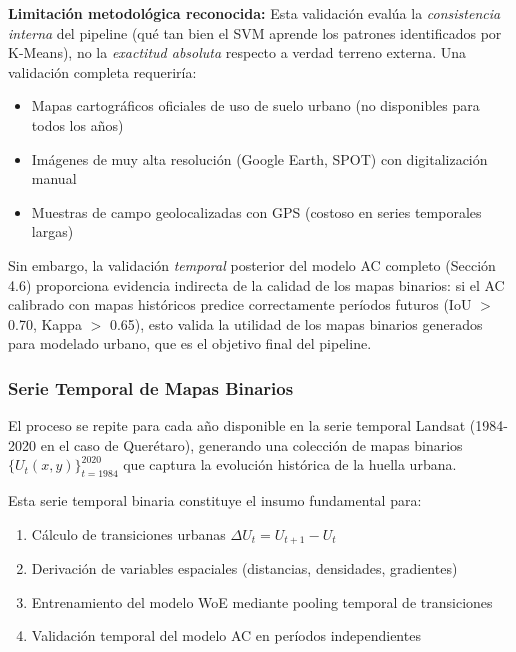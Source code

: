 \textbf{Limitación metodológica reconocida:} Esta validación evalúa la \textit{consistencia interna} del pipeline (qué tan bien el SVM aprende los patrones identificados por K-Means), no la \textit{exactitud absoluta} respecto a verdad terreno externa. Una validación completa requeriría:

\begin{itemize}[itemsep=2pt]
	\item Mapas cartográficos oficiales de uso de suelo urbano (no disponibles para todos los años)
	\item Imágenes de muy alta resolución (Google Earth, SPOT) con digitalización manual
	\item Muestras de campo geolocalizadas con GPS (costoso en series temporales largas)
\end{itemize}

Sin embargo, la validación \textit{temporal} posterior del modelo AC completo (Sección 4.6) proporciona evidencia indirecta de la calidad de los mapas binarios: si el AC calibrado con mapas históricos predice correctamente períodos futuros (IoU $>$ 0.70, Kappa $>$ 0.65), esto valida la utilidad de los mapas binarios generados para modelado urbano, que es el objetivo final del pipeline.

\subsubsection{Serie Temporal de Mapas Binarios}

El proceso se repite para cada año disponible en la serie temporal Landsat (1984-2020 en el caso de Querétaro), generando una colección de mapas binarios $\{U_t(x,y)\}_{t=1984}^{2020}$ que captura la evolución histórica de la huella urbana.

Esta serie temporal binaria constituye el insumo fundamental para:
\begin{enumerate}[itemsep=2pt]
	\item Cálculo de transiciones urbanas $\Delta U_t = U_{t+1} - U_t$
	\item Derivación de variables espaciales (distancias, densidades, gradientes)
	\item Entrenamiento del modelo WoE mediante pooling temporal de transiciones
	\item Validación temporal del modelo AC en períodos independientes
\end{enumerate}


